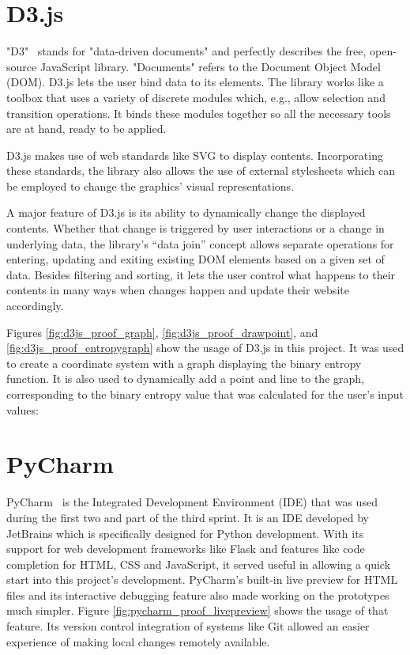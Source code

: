 \section{D3.js} \label{d3js}
"D3"~\cite{d3js_what_is_d3} stands for "data-driven documents" and perfectly describes the free, open-source JavaScript library. "Documents" refers to the Document Object Model (DOM). D3.js lets the user bind data to its elements. The library works like a toolbox that uses a variety of discrete modules which, e.g., allow selection and transition operations. It binds these modules together so all the necessary tools are at hand, ready to be applied.

D3.js makes use of web standards like SVG to display contents. Incorporating these standards, the library also allows the use of external stylesheets which can be employed to change the graphics' visual representations.

A major feature of D3.js is its ability to dynamically change the displayed contents. Whether that change is triggered by user interactions or a change in underlying data, the library's ``data join'' concept allows separate operations for entering, updating and exiting existing DOM elements based on a given set of data. Besides filtering and sorting, it lets the user control what happens to their contents in many ways when changes happen and update their website accordingly.

Figures \ref{fig:d3js_proof_graph}, \ref{fig:d3js_proof_drawpoint}, and \ref{fig:d3js_proof_entropygraph} show the usage of D3.js in this project. It was used to create a coordinate system with a graph displaying the binary entropy function. It is also used to dynamically add a point and line to the graph, corresponding to the binary entropy value that was calculated for the user's input values:
\pagebreak

\section{PyCharm} \label{pycharm}
PyCharm~\cite{pycharm} is the Integrated Development Environment (IDE) that was used during the first two and part of the third sprint. It is an IDE developed by JetBrains which is specifically designed for Python development. With its support for web development frameworks like Flask and features like code completion for HTML, CSS and JavaScript, it served useful in allowing a quick start into this project's development.
PyCharm's built-in live preview for HTML files and its interactive debugging feature also made working on the prototypes much simpler. Figure \ref{fig:pycharm_proof_livepreview} shows the usage of that feature.
Its version control integration of systems like Git allowed an easier experience of making local changes remotely available.

